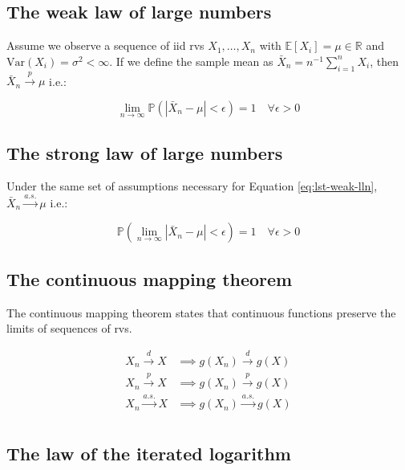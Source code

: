 \documentclass{report}
\begin{document}
\subsection{The weak law of large numbers}

Assume we observe a sequence of \gls{iid} \glspl{rv} $X_1, \dots, X_n$ with $\mathbb{E}[X_i] = \mu \in \mathbb{R}$ and $\text{Var}(X_i) = \sigma^2 < \infty$. If we define the sample mean as $\bar{X}_n = n^{-1}\sum_{i=1}^n X_i$, then $\bar{X}_n \overset{p}{\to} \mu$ i.e.:

\begin{equation}\label{eq:lst-weak-lln}
    \lim_{n\to\infty} \mathbb{P}\left(\left|\bar{X}_n - \mu\right| < \epsilon\right) = 1 \quad \forall \epsilon > 0
\end{equation}

\subsection{The strong law of large numbers}

Under the same set of assumptions necessary for Equation \ref{eq:lst-weak-lln}, $\bar{X}_n \overset{a.s.}{\to} \mu$ i.e.:

\begin{equation}\label{eq:lst-strong-lln}
    \mathbb{P}\left(\lim_{n\to\infty} \left|\bar{X}_n - \mu\right| < \epsilon\right) = 1 \quad \forall \epsilon > 0
\end{equation}

\subsection{The continuous mapping theorem}

The continuous mapping theorem states that continuous functions preserve the limits of sequences of \glspl{rv}. 

\begin{equation}\label{eq:lst-cmt}
    \begin{aligned}
      X_n \overset{d}{\to} X &\implies g(X_n) \overset{d}{\to} g(X) \\
      X_n \overset{p}{\to} X &\implies g(X_n) \overset{p}{\to} g(X) \\
      X_n \overset{a.s.}{\to} X &\implies g(X_n) \overset{a.s.}{\to} g(X) \\
    \end{aligned}
\end{equation}

\subsection{The law of the iterated logarithm}
\end{document}
